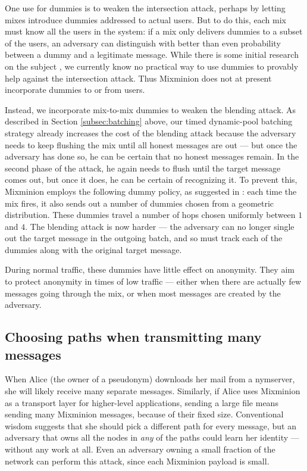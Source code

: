 \documentclass[final]{ieee}
\begin{document}
One use for dummies is to weaken the intersection attack, perhaps by letting
mixes introduce dummies addressed to actual users. But to do this, each mix
must know all the users in the system: if a mix only delivers dummies to a
subset of the users, an adversary can distinguish with better than even
probability between a dummy and a legitimate message. While there is some
initial research on the subject \cite{langos02}, we currently know no
practical way to use dummies to provably help against the intersection
attack. Thus Mixminion does not at present incorporate dummies to or from
users.

Instead, we incorporate mix-to-mix dummies to weaken the blending attack.  As
described in
Section \ref{subsec:batching} above, our timed
dynamic-pool batching strategy already increases the cost of the blending attack
because the adversary needs to keep flushing the mix until all honest
messages are out --- but once the adversary has done so, he can be certain that no
honest messages remain. In the second phase of the attack, he again
needs to flush until the target message comes out, but once it does, he
can be certain of recognizing it. To prevent this, Mixminion employs the following
dummy policy, as suggested in \cite{trickle02}:
each time the mix
fires, it also sends out a number of dummies chosen from a geometric
distribution. These dummies travel a number of hops chosen uniformly
between $1$ and $4$. The blending attack is now harder --- the adversary
can no longer single out the target message in the outgoing batch, and so
must track each of the dummies along with the original target message.

During normal traffic, these dummies have little effect on anonymity. They
aim to protect anonymity in times of low traffic --- either when there are
actually few messages going through the mix, or when most messages are
created by the adversary.

\subsection{Choosing paths when transmitting many messages}
\label{subsec:many-messages}

When Alice (the owner of a pseudonym) downloads her mail from a
nymserver, she will likely receive many separate messages. Similarly, if
Alice uses Mixminion as a transport layer for higher-level applications,
sending a large file means sending many Mixminion messages, because of
their fixed size.
Conventional wisdom suggests that she should pick a different
path for every message, but an adversary that owns all the nodes in
\emph{any} of the paths could learn her identity --- without any work
at all. Even an adversary owning a small fraction of the network
can perform this attack, since each Mixminion payload is small.
\end{document}

